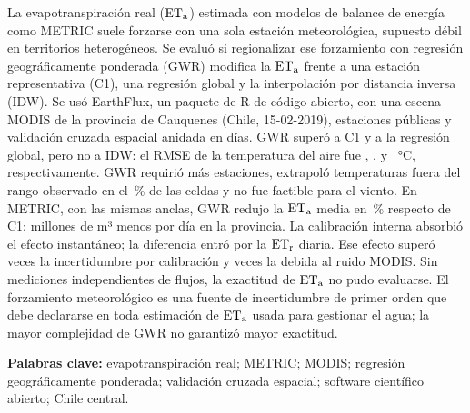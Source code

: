 La evapotranspiración real ($\mathrm{ET_a}$) estimada con modelos de balance
de energía como METRIC suele forzarse con una sola estación meteorológica,
supuesto débil en territorios heterogéneos. Se evaluó si regionalizar ese
forzamiento con regresión geográficamente ponderada (GWR) modifica la $\mathrm{ET_a}$
frente a una estación representativa (C1), una regresión global y la
interpolación por distancia inversa (IDW). Se usó EarthFlux, un paquete de R
de código abierto, con una escena MODIS de la provincia de Cauquenes (Chile,
15-02-2019), \NStations{} estaciones públicas y validación cruzada espacial
anidada en \NCVDays{} días. GWR superó a C1 y a la regresión global, pero no a
IDW: el RMSE de la temperatura del aire fue \CVTaCOneRmse{}, \CVTaCTwoOLSRmse{},
\CVTaCThreeGWRRmse{} y \CVTaCTwoIDWRmse~\si{\celsius}, respectivamente. GWR requirió
más estaciones, extrapoló temperaturas fuera del rango observado en el
\RangeTaCThreeGWRAbove\,\% de las celdas y no fue factible para el viento.
En METRIC, con las mismas anclas, GWR redujo la $\mathrm{ET_a}$ media en
\DEtaCThreeGWRPct\,\% respecto de C1: \VolDiffAbsCThreeGWR{} millones de m³ menos
por día en la provincia. La calibración interna absorbió el
efecto instantáneo; la diferencia entró por la $\mathrm{ET_r}$ diaria. Ese efecto superó \RatioSA{} veces la
incertidumbre por calibración y \RatioSB{} veces la debida al ruido MODIS.
Sin mediciones independientes de flujos, la exactitud de $\mathrm{ET_a}$ no pudo
evaluarse. El forzamiento meteorológico es una fuente de incertidumbre de
primer orden que debe declararse en toda estimación de $\mathrm{ET_a}$ usada para
gestionar el agua; la mayor complejidad de GWR no garantizó mayor exactitud.

\medskip\noindent\textbf{Palabras clave:} evapotranspiración real; METRIC;
MODIS; regresión geográficamente ponderada; validación cruzada espacial;
software científico abierto; Chile central.
